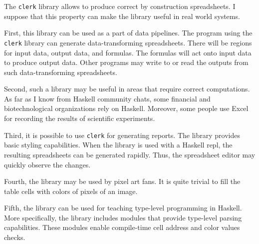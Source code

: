 The \texttt{clerk} library allows to produce correct by construction spreadsheets.
I suppose that this property can make the library useful in real world systems.

First, this library can be used as a part of data pipelines.
The program using the \texttt{clerk} library can generate data-transforming spreadsheets.
There will be regions for input data, output data, and formulas.
The formulas will act onto input data to produce output data.
Other programs may write to or read the outputs from such data-transforming spreadsheets.

Second, such a library may be useful in areas that require correct computations.
As far as I know from Haskell community chats, some financial and biotechnological organizations rely on Haskell.
Moreover, some people use Excel for recording the results of scientific experiments.

Third, it is possible to use \texttt{clerk} for generating reports.
The library provides basic styling capabilities.
When the library is used with a Haskell repl, the resulting spreadsheets can be generated rapidly.
Thus, the spreadsheet editor may quickly observe the changes.

Fourth, the library may be used by pixel art fans.
It is quite trivial to fill the table cells with colors of pixels of an image.

Fifth, the library can be used for teaching type-level programming in Haskell.
More specifically, the library includes modules that provide type-level parsing capabilities.
These modules enable compile-time cell address and color values checks.

